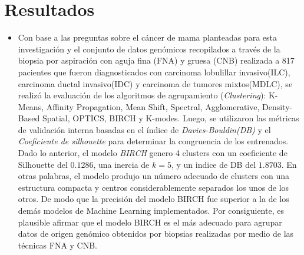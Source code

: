 \section{Resultados}
\begin{itemize}[label=\HandPencilLeft]
	\item Con base a las preguntas sobre el cáncer de mama planteadas para esta investigación y el conjunto de datos genómicos recopilados a través de la biopsia por aspiración con aguja fina (FNA) y gruesa (CNB) realizada a 817 pacientes que fueron diagnosticados con carcinoma lobulillar invasivo(ILC), carcinoma ductal invasivo(IDC) y carcinoma de tumores mixtos(MDLC), se realizó la evaluación de los algoritmos de agrupamiento (\textit{Clustering}): K-Means, Affinity Propagation, Mean Shift, Spectral, Agglomerative, Density-Based Spatial, OPTICS, BIRCH y K-modes. Luego, se utilizaron las métricas de validación interna basadas en el índice de \textit{Davies-Bouldin(DB)} y el \textit{Coeficiente de silhouette} para determinar la congruencia de los  entrenados. Dado lo anterior, el modelo \textit{BIRCH} genero 4 clusters con un coeficiente de Silhouette del $0.1286$, una inercia de $k = 5 $, y un indice de DB del $1.8703$. En otras palabras, el modelo produjo un número adecuado de clusters con una estructura compacta y centros considerablemente separados los unos de los otros. De modo que la precisión del modelo BIRCH fue superior a la de los demás modelos de Machine Learning implementados. Por consiguiente, es plausible afirmar que el modelo BIRCH es el más adecuado para agrupar datos de origen genómico obtenidos por biopsias realizadas por medio de las técnicas FNA y CNB.
\end{itemize}


